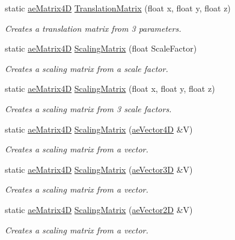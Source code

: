 \begin{DoxyCompactItemize}
static \hyperlink{structae_core_1_1ae_matrix4_d}{ae\+Matrix4D} \hyperlink{structae_core_1_1ae_matrix4_d_a9513180f91e888013ba237395dd55a4b}{Translation\+Matrix} (float x, float y, float z)
\begin{DoxyCompactList}\small\item\em Creates a translation matrix from 3 parameters. \end{DoxyCompactList}\item 
static \hyperlink{structae_core_1_1ae_matrix4_d}{ae\+Matrix4D} \hyperlink{structae_core_1_1ae_matrix4_d_aa09473053508854625d09c349f8bae8f}{Scaling\+Matrix} (float Scale\+Factor)
\begin{DoxyCompactList}\small\item\em Creates a scaling matrix from a scale factor. \end{DoxyCompactList}\item 
static \hyperlink{structae_core_1_1ae_matrix4_d}{ae\+Matrix4D} \hyperlink{structae_core_1_1ae_matrix4_d_a06b3d795a2db577818e8e240b3fc4bb5}{Scaling\+Matrix} (float x, float y, float z)
\begin{DoxyCompactList}\small\item\em Creates a scaling matrix from 3 scale factors. \end{DoxyCompactList}\item 
static \hyperlink{structae_core_1_1ae_matrix4_d}{ae\+Matrix4D} \hyperlink{structae_core_1_1ae_matrix4_d_a9340034c63a9f9914185209201c9587f}{Scaling\+Matrix} (\hyperlink{structae_core_1_1ae_vector4_d}{ae\+Vector4D} \&V)
\begin{DoxyCompactList}\small\item\em Creates a scaling matrix from a vector. \end{DoxyCompactList}\item 
static \hyperlink{structae_core_1_1ae_matrix4_d}{ae\+Matrix4D} \hyperlink{structae_core_1_1ae_matrix4_d_acb9b44ee5f5e7cfe230eebe00ff257cb}{Scaling\+Matrix} (\hyperlink{structae_core_1_1ae_vector3_d}{ae\+Vector3D} \&V)
\begin{DoxyCompactList}\small\item\em Creates a scaling matrix from a vector. \end{DoxyCompactList}\item 
static \hyperlink{structae_core_1_1ae_matrix4_d}{ae\+Matrix4D} \hyperlink{structae_core_1_1ae_matrix4_d_af7ed12e53c6e4b789df19c3ed7b6f023}{Scaling\+Matrix} (\hyperlink{structae_core_1_1ae_vector2_d}{ae\+Vector2D} \&V)
\begin{DoxyCompactList}\small\item\em Creates a scaling matrix from a vector. \end{DoxyCompactList}\item 

\end{DoxyCompactItemize}
